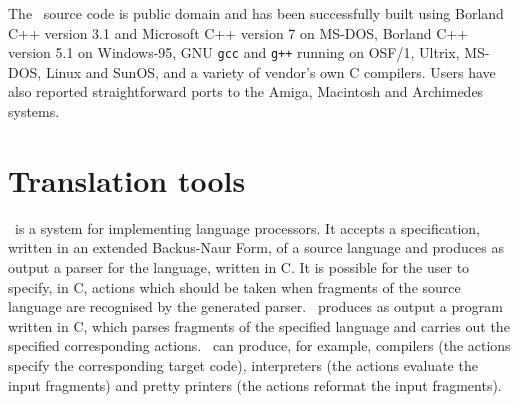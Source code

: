 \vspace*{3ex}

The \rdp\ source code is public domain and has been successfully built
using Borland C++ version 3.1 and Microsoft C++ version 7 on MS-DOS,
Borland C++ version 5.1 on Windows-95, GNU {\tt gcc} and {\tt g++}
running on OSF/1, Ultrix, MS-DOS, Linux and SunOS, and a variety of
vendor's own C compilers. Users have also reported straightforward ports
to the Amiga, Macintosh and Archimedes systems.

\vspace*{\fill}
\begin{center}
\end{center}
\clearpage
{}
\tableofcontents
\clearpage
\setcounter{page}{0}
\chapter{Translation tools}

\rdp\ is a system for implementing language processors. It accepts a
specification, written in an extended Backus-Naur Form, of a source
language and produces as output a parser for the language, written in C.
It is possible for the user to specify, in C, actions which  should be
taken when fragments of the source language are recognised by the
generated parser. \rdp\
produces as output a program written in C, which parses fragments of the
specified language  and carries out the specified corresponding actions.
\rdp\ can produce, for example, compilers (the actions specify the
corresponding target code), interpreters (the actions evaluate the input
fragments) and pretty printers (the actions reformat the input
fragments).

